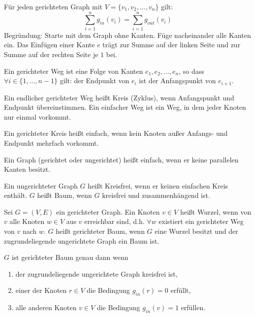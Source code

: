 \begin{bemerkung}
	Für jeden gerichteten Graph mit $V = \{ v_1, v_2, \dots, v_n \}$ gilt: $$\sum_{i=1}^n g_{in}(v_i) = \sum_{i=1}^n g_{out}(v_i)$$
	Begründung: Starte mit dem Graph ohne Kanten. Füge nacheinander alle Kanten ein. Das Einfügen einer Kante $e$ trägt zur Summe auf der linken Seite und zur Summe auf der rechten Seite je $1$ bei.
\end{bemerkung}


\begin{definition}
	
	Ein gerichteter Weg ist eine Folge von Kanten $e_1, e_2, \dots, e_n$, so dass $\forall i \in \{ 1, \dots, n-1 \}$ gilt: der Endpunkt von $e_i$ ist der Anfangspunkt von $e_{i+1}$.
	
	Ein endlicher gerichteter Weg heißt Kreis (Zyklus), wenn Anfangspunkt und Endpunkt übereinstimmen. Ein einfacher Weg ist ein Weg, in dem jeder Knoten nur einmal vorkommt.
	
	Ein gerichteter Kreis heißt einfach, wenn kein Knoten außer Anfangs- und Endpunkt mehrfach vorkommt.
\end{definition}


\begin{definition}

	Ein Graph (gerichtet oder ungerichtet) heißt einfach, wenn er keine parallelen Kanten besitzt.
\end{definition}


\begin{definition}
	
	Ein ungerichteter Graph $G$ heißt Kreisfrei, wenn er keinen einfachen Kreis enthält. $G$ heißt Baum, wenn $G$ kreisfrei und zusammenhängend ist.
\end{definition}


\begin{definition}

	Sei $G = (V, E)$ ein gerichteter Graph. Ein Knoten $v \in V$ heißt Wurzel, wenn von $v$ alle Knoten $w \in V$ aus $v$ erreichbar sind, d.h. $\forall w$  existiert ein gerichteter Weg von $v$ nach $w$. $G$ heißt gerichteter Baum, wenn $G$ eine Wurzel besitzt und der zugrundeliegende ungerichtete Graph ein Baum ist.
\end{definition}


\begin{bemerkung}
	$G$ ist gerichteter Baum genau dann wenn
	\begin{enumerate}
		\item der zugrundeliegende ungerichtete Graph kreisfrei ist,
		\item einer der Knoten $r \in V$ die Bedingung $g_{in}(r) = 0$ erfüllt,
		\item alle anderen Knoten $v \in V$ die Bedingung $g_{in}(v) = 1$ erfüllen.
	\end{enumerate}
\end{bemerkung}


